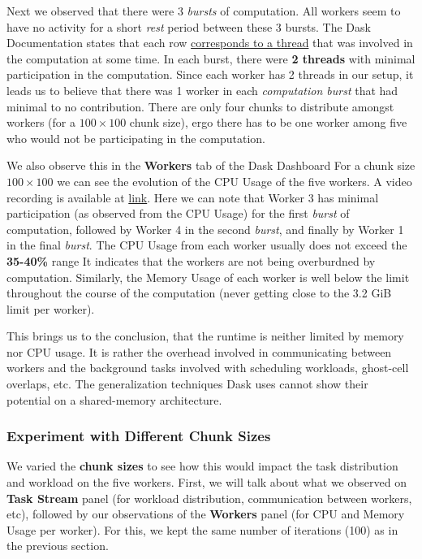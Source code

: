\documentclass[a4paper,12pt]{article}
\begin{document}
Next we observed that there were 3 \textit{bursts} of computation.
All workers seem to have no activity for a short \textit{rest} period between these 3 bursts.
The Dask Documentation states that each row \underline{corresponds to a thread} that was involved in the computation at some time.
In each burst, there were \textbf{2 threads} with minimal participation in the computation.
Since each worker has 2 threads in our setup, it leads us to believe that there was 1 worker in each \textit{computation burst} that had minimal to no contribution.
There are only four chunks to distribute amongst workers (for a $100 \times 100$ chunk size), ergo there has to be one worker among five who would not be participating in the computation. 

We also observe this in the \textbf{Workers} tab of the Dask Dashboard
For a chunk size $100 \times 100$ we can see the evolution of the CPU Usage of the five workers.
A video recording is available at \href{https://github.com/paulmyr/DD2358-HPC25/tree/master/04_parallel/bonus#chunk-size-100}{link}.
Here we can note that Worker 3 has minimal participation (as observed from the CPU Usage) for the first \textit{burst} of computation, followed by Worker 4 in the second \textit{burst}, and finally by Worker 1 in the final \textit{burst}.
The CPU Usage from each worker usually does not exceed the \textbf{35-40\%} range
It indicates that the workers are not being overburdned by computation.
Similarly, the Memory Usage of each worker is well below the limit throughout the course of the computation (never getting close to the 3.2 GiB limit per worker).

This brings us to the conclusion, that the runtime is neither limited by memory nor CPU usage.
It is rather the overhead involved in communicating between workers and the background tasks involved with scheduling workloads, ghost-cell overlaps, etc.
The generalization techniques Dask uses cannot show their potential on a shared-memory architecture.

\subsubsection{Experiment with Different Chunk Sizes}
\label{sec:experiment_with_different_chunk_sizes}
We varied the \textbf{chunk sizes} to see how this would impact the task distribution and workload on the five workers.
First, we will talk about what we observed on \textbf{Task Stream} panel (for workload distribution, communication between workers, etc), followed by our observations of the \textbf{Workers} panel (for CPU and Memory Usage per worker). For this, we kept the same number of iterations (100) as in the previous section.
\end{document}
